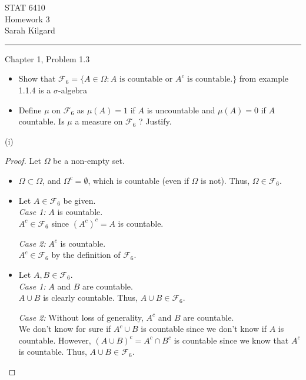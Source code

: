 \documentclass[12pt,letterpaper, onecolumn]{exam}
\newcommand{\sigmaF}{\mathcal{F}}
\begin{document}
\begingroup  
    \centering
    \LARGE STAT 6410\\
    \LARGE Homework 3 \\[0.5em]
    \large Sarah Kilgard\par
\endgroup
\rule{\textwidth}{0.4pt}
\pointsdroppedatright   %
\printanswers
\renewcommand{\solutiontitle}{\noindent\textbf{Ans:}\enspace}   %

\begin{questions}
    \question Chapter 1, Problem 1.3
    \begin{itemize}
        \item[(i)] Show that $\sigmaF_6 = \{A \in \Omega: A \textrm{ is countable or } A^c \textrm{ is countable.}\}$ from example 1.1.4 is a $\sigma$-algebra 
        \item[(ii)] Define $\mu$ on $\sigmaF_6$ as $\mu(A) = 1$ if $A$ is uncountable and $\mu(A) = 0$ if $A$ countable. Is $\mu$ a measure on $\sigmaF_6$ ? Justify.
    \end{itemize}
    \begin{solution}
    
    (i)
    \begin{proof}
    Let $\Omega$ be a non-empty set. 
    \begin{itemize}
        \item[(a)] $\Omega \subset \Omega$, and $\Omega^c = \emptyset$, which is countable (even if $\Omega$ is not). Thus, $\Omega \in \sigmaF_6$.
        \item[(b)] Let $A \in \sigmaF_6$ be given. \\
        \textit{Case 1:} $A$ is countable. \\ 
        $A^c \in \sigmaF_6$ since $(A^c)^c = A$ is countable. 
        
        \textit{Case 2:} $A^c$ is countable. \\
        $A^c \in \sigmaF_6$ by the definition of $\sigmaF_6$.
        \item[(c)] Let $A, B \in \sigmaF_6$. \\
        \textit{Case 1:} $A$ and $B$ are countable. \\ $A \cup B$ is clearly countable. Thus, $A \cup B \in \sigmaF_6$.

        \textit{Case 2:} Without loss of generality, $A^c$ and $B$ are countable. \\
        We don't know for sure if $A^c \cup B$ is countable since we don't know if $A$ is countable. However, $(A \cup B)^c = A^c \cap B^c$ is countable since we know that $A^c$ is countable. Thus, $A \cup B \in \sigmaF_6$.


\end{itemize}
\end{proof}
\end{solution}
\end{questions}
\end{document}
